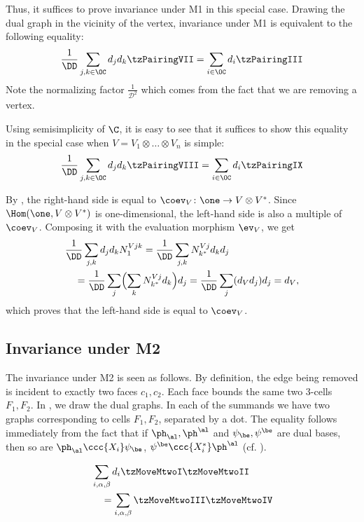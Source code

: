 Thus, it suffices to prove invariance under M1 in this
special case. Drawing the dual graph in the vicinity of the vertex,
invariance under M1 is equivalent to the following equality:
$$
\frac{1}{\DD}\sum_{j,k\in \OC}d_{j}d_{k}\tzPairingVII
=
\sum_{i\in \OC}d_{i}\tzPairingIII
$$
Note the normalizing factor
$\frac{1}{\mathcal{D}^2}$ which comes from the fact that we are removing a
vertex.

Using semisimplicity of $\C$, it is easy to see that it suffices to show
this equality in the special case when $V=V_1\otimes \dots \otimes V_n$ is
simple:
$$
\frac{1}{\DD}\sum_{j,k\in \OC}d_{j}d_{k}\tzPairingVIII
=
\sum_{i\in \OC}d_{i}\tzPairingIX
$$

By , the right-hand side is equal to $\coev_V\colon \one
\to V\otimes V^*$. Since $\Hom(\one, V\otimes V^*)$ is one-dimensional,
the left-hand side is also a multiple of $\coev_V$. Composing it with the
evaluation morphism  $\ev_V$, we get
\begin{align*}
	&\frac{1}{\DD}\sum_{j,k}d_jd_kN_{1}^{Vjk} =
	\frac{1}{\DD}\sum_{j,k}N_{k^*}^{Vj}d_kd_j\\
	&\quad=\frac{1}{\DD}\sum_{j}\Bigl(\sum_{k}N_{k^*}^{Vj}d_k\Bigr)d_j=
	\frac{1}{\DD}\sum_{j}(d_{V}d_j)d_j=d_V,
\end{align*}
which proves that the left-hand side is equal to $\coev_V$.






\subsection*{Invariance under M2}
The invariance under M2 is seen as follows. By definition, the edge being
removed is incident to exactly two faces $c_1, c_2$. Each face bounds the
same two 3-cells $F_1, F_2$. In  , we draw the dual graphs.
In each of the summands we have two graphs corresponding to cells $F_1,
F_2$, separated by a dot.  The equality follows
immediately from the fact that if $\ph_\al,\ph^\al$ and $\psi_\be,\psi^\be$ 
are dual bases, then so are $\ph_\al\ccc{X_i}\psi_\be$, $\psi^\be\ccc{X_i^*}\ph^\al$ 
(cf. ). 
\begin{figure}[ht]
	\begin{align*}
		&\sum_{i,\alpha,\beta}d_{i}\tzMoveMtwoI \tzMoveMtwoII\\ 
		&\quad= \sum_{i,\alpha,\beta} \tzMoveMtwoIII \tzMoveMtwoIV
	\end{align*}
	\caption{}\label{f:move2}
\end{figure}

